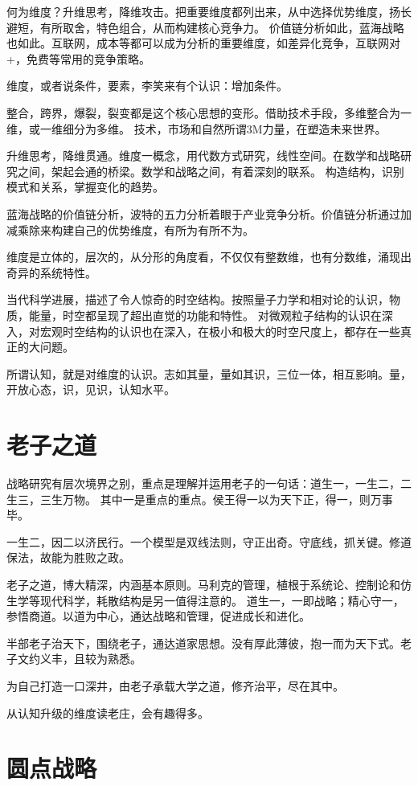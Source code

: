 何为维度？升维思考，降维攻击。把重要维度都列出来，从中选择优势维度，扬长避短，有所取舍，特色组合，从而构建核心竞争力。
价值链分析如此，蓝海战略也如此。互联网，成本等都可以成为分析的重要维度，如差异化竞争，互联网对+，免费等常用的竞争策略。

维度，或者说条件，要素，李笑来有个认识：增加条件。

整合，跨界，爆裂，裂变都是这个核心思想的变形。借助技术手段，多维整合为一维，或一维细分为多维。
技术，市场和自然所谓3M力量，在塑造未来世界。

升维思考，降维贯通。维度一概念，用代数方式研究，线性空间。在数学和战略研究之间，架起会通的桥梁。数学和战略之间，有着深刻的联系。
构造结构，识别模式和关系，掌握变化的趋势。

蓝海战略的价值链分析，波特的五力分析着眼于产业竞争分析。价值链分析通过加减乘除来构建自己的优势维度，有所为有所不为。

维度是立体的，层次的，从分形的角度看，不仅仅有整数维，也有分数维，涌现出奇异的系统特性。

当代科学进展，描述了令人惊奇的时空结构。按照量子力学和相对论的认识，物质，能量，时空都呈现了超出直觉的功能和特性。
对微观粒子结构的认识在深入，对宏观时空结构的认识也在深入，在极小和极大的时空尺度上，都存在一些真正的大问题。

所谓认知，就是对维度的认识。志如其量，量如其识，三位一体，相互影响。量，开放心态，识，见识，认知水平。

\section{老子之道}

战略研究有层次境界之别，重点是理解并运用老子的一句话：道生一，一生二，二生三，三生万物。
其中一是重点的重点。侯王得一以为天下正，得一，则万事毕。

一生二，因二以济民行。一个模型是双线法则，守正出奇。守底线，抓关键。修道保法，故能为胜败之政。

老子之道，博大精深，内涵基本原则。马利克的管理，植根于系统论、控制论和仿生学等现代科学，耗散结构是另一值得注意的。
道生一，一即战略；精心守一，参悟商道。以道为中心，通达战略和管理，促进成长和进化。

半部老子治天下，围绕老子，通达道家思想。没有厚此薄彼，抱一而为天下式。老子文约义丰，且较为熟悉。

为自己打造一口深井，由老子承载大学之道，修齐治平，尽在其中。

从认知升级的维度读老庄，会有趣得多。

\section{圆点战略}

